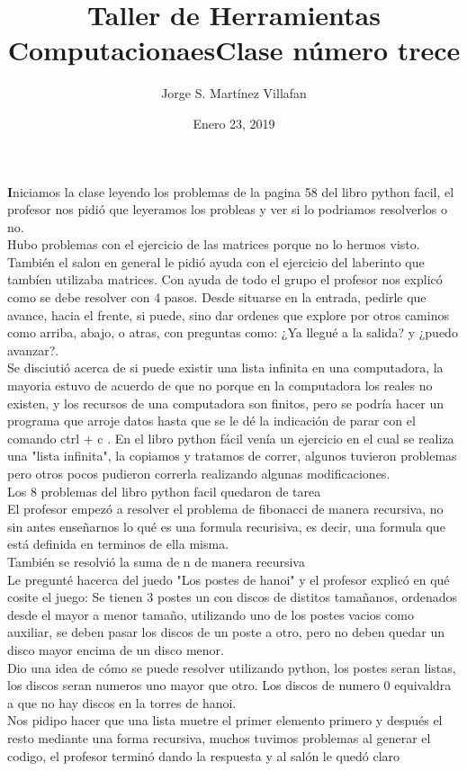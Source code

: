 \documentclass[letterpaper, 12pt, oneside]{article}%
\title{\Huge Taller de Herramientas Computacionaes}
\author{Jorge S. Martínez Villafan}
\date{Enero 23, 2019}
\begin{document}
\maketitle
\newpage
\title{Clase número trece}

\textbf Iniciamos la clase leyendo los problemas de la pagina 58 del libro python facil, el profesor nos pidió que leyeramos los probleas y ver si lo podriamos resolverlos o no.\\
Hubo problemas con el ejercicio de las matrices porque no lo hermos visto.\\ 
También el salon en general le pidió ayuda con el ejercicio del laberinto que tambíen utilizaba matrices. Con ayuda de todo el grupo el profesor nos explicó como se debe resolver con 4 pasos. Desde situarse en la entrada, pedirle que avance, hacia el frente, si puede, sino dar ordenes que explore por otros caminos como arriba, abajo, o atras, con preguntas como: ¿Ya llegué a la salida? y ¿puedo avanzar?.\\

Se disciutió acerca de si puede existir una lista infinita en una computadora, la mayoria estuvo de acuerdo de que no porque en la computadora los reales no existen, y los recursos de una computadora son finitos, pero se podría hacer un programa que arroje datos hasta que se le dé la indicación de parar con el comando \color{blue}ctrl + c \color{black}. En el libro python fácil venía un ejercicio en el cual se realiza una "lista infinita", la copiamos y tratamos de correr, algunos tuvieron problemas pero otros pocos pudieron correrla realizando algunas modificaciones.\\
Los 8 problemas del libro python facil quedaron de tarea\\
El profesor empezó a resolver el problema de fibonacci de manera recursiva, no sin antes enseñarnos lo qué es una formula recurisiva, es decir, una formula que está definida en terminos de ella misma.\\
También se resolvió la suma de n de manera recursiva \\
Le pregunté hacerca del juedo "Los postes de hanoi" y el profesor explicó en qué cosite el juego: Se tienen 3 postes un con discos de distitos tamañanos, ordenados desde el mayor a menor tamaño, utilizando uno de los postes vacios como auxiliar, se deben pasar los discos de un poste a otro, pero no deben quedar un disco mayor encima de un disco menor. \\
Dio una idea de cómo se puede resolver utilizando python, los postes seran listas, los discos seran numeros uno mayor que otro. Los discos de numero 0 equivaldra a que no hay discos en la torres de hanoi.\\
Nos pidipo hacer que una lista muetre el primer elemento primero y después el resto mediante una forma recursiva, muchos tuvimos problemas al generar el codigo, el profesor terminó dando la respuesta y al salón le quedó claro\\
\end{document}
